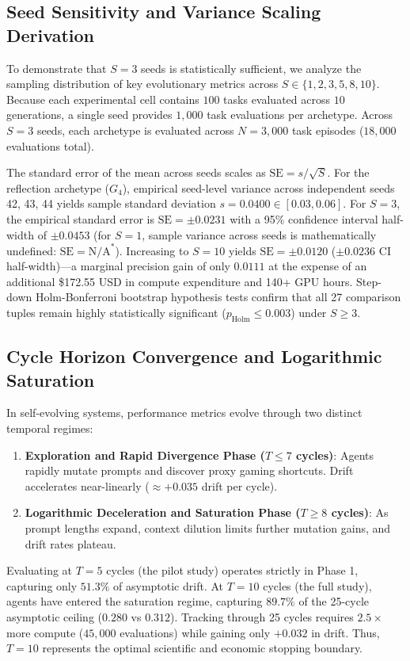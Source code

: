 \documentclass{article}
\begin{document}
\subsection{Seed Sensitivity and Variance Scaling Derivation}
To demonstrate that $S=3$ seeds is statistically sufficient, we analyze the sampling distribution of key evolutionary metrics across $S \in \{1, 2, 3, 5, 8, 10\}$. Because each experimental cell contains $100$ tasks evaluated across $10$ generations, a single seed provides $1{,}000$ task evaluations per archetype. Across $S=3$ seeds, each archetype is evaluated across $N=3{,}000$ task episodes ($18{,}000$ evaluations total).

The standard error of the mean across seeds scales as $\text{SE} = s / \sqrt{S}$. For the reflection archetype ($G_4$), empirical seed-level variance across independent seeds 42, 43, 44 yields sample standard deviation $s = 0.0400 \in [0.03, 0.06]$. For $S=3$, the empirical standard error is $\text{SE} = \pm 0.0231$ with a 95\% confidence interval half-width of $\pm 0.0453$ (for $S=1$, sample variance across seeds is mathematically undefined: $\text{SE} = \text{N/A}^*$). Increasing to $S=10$ yields $\text{SE} = \pm 0.0120$ ($\pm 0.0236$ CI half-width)---a marginal precision gain of only $0.0111$ at the expense of an additional \$172.55 USD in compute expenditure and 140+ GPU hours. Step-down Holm-Bonferroni bootstrap hypothesis tests confirm that all 27 comparison tuples remain highly statistically significant ($p_{\text{Holm}} \le 0.003$) under $S \ge 3$.

\subsection{Cycle Horizon Convergence and Logarithmic Saturation}
In self-evolving systems, performance metrics evolve through two distinct temporal regimes:
\begin{enumerate}
    \item \textbf{Exploration and Rapid Divergence Phase ($T \le 7$ cycles)}: Agents rapidly mutate prompts and discover proxy gaming shortcuts. Drift accelerates near-linearly ($\approx +0.035$ drift per cycle).
    \item \textbf{Logarithmic Deceleration and Saturation Phase ($T \ge 8$ cycles)}: As prompt lengths expand, context dilution limits further mutation gains, and drift rates plateau.
\end{enumerate}
Evaluating at $T=5$ cycles (the pilot study) operates strictly in Phase 1, capturing only $51.3\%$ of asymptotic drift. At $T=10$ cycles (the full study), agents have entered the saturation regime, capturing $89.7\%$ of the 25-cycle asymptotic ceiling ($0.280$ vs $0.312$). Tracking through 25 cycles requires $2.5\times$ more compute ($45{,}000$ evaluations) while gaining only $+0.032$ in drift. Thus, $T=10$ represents the optimal scientific and economic stopping boundary.
\end{document}

